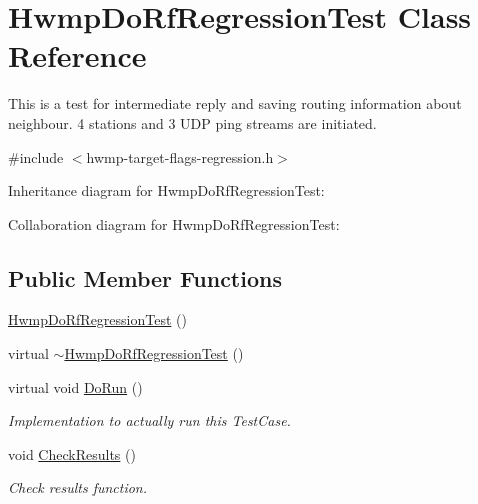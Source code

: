 \hypertarget{classHwmpDoRfRegressionTest}{}\section{Hwmp\+Do\+Rf\+Regression\+Test Class Reference}
\label{classHwmpDoRfRegressionTest}


This is a test for intermediate reply and saving routing information about neighbour. 4 stations and 3 U\+DP ping streams are initiated.  




{\ttfamily \#include $<$hwmp-\/target-\/flags-\/regression.\+h$>$}



Inheritance diagram for Hwmp\+Do\+Rf\+Regression\+Test\+:


Collaboration diagram for Hwmp\+Do\+Rf\+Regression\+Test\+:
\subsection*{Public Member Functions}
\begin{DoxyCompactItemize}
\item 
\hyperlink{classHwmpDoRfRegressionTest_ace0093e65e99423f170f286c04aea495}{Hwmp\+Do\+Rf\+Regression\+Test} ()
\item 
virtual \hyperlink{classHwmpDoRfRegressionTest_af3a6efbafd5c8eaa3536623c653e0b7a}{$\sim$\+Hwmp\+Do\+Rf\+Regression\+Test} ()
\item 
virtual void \hyperlink{classHwmpDoRfRegressionTest_a31af438e94ab7ed25d9837a3f47f77b0}{Do\+Run} ()
\begin{DoxyCompactList}\small\item\em Implementation to actually run this Test\+Case. \end{DoxyCompactList}\item 
void \hyperlink{classHwmpDoRfRegressionTest_a817fd52a29f0d5f0de634bbac4a05c8d}{Check\+Results} ()
\begin{DoxyCompactList}\small\item\em Check results function. \end{DoxyCompactList}\end{DoxyCompactItemize}
